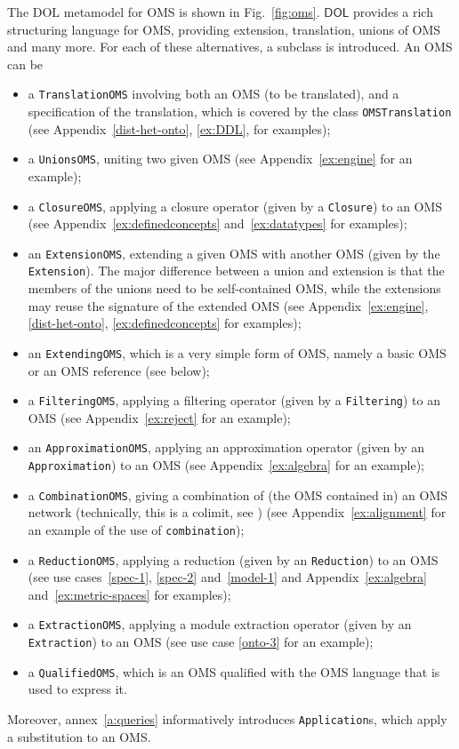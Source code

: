 \documentclass[10pt, a4paper]{isov2}
\newcommand*{\syntax}[1]{\texttt{#1}}
\newcommand*{\DOL}{\ensuremath{\mathsf{DOL}}\xspace}
\begin{document}
\label{c:OMS}



The DOL metamodel for OMS is shown in Fig.~\ref{fig:oms}.
\DOL provides a rich structuring language for OMS, providing
extension, translation, unions of OMS and many more.  For each of
these alternatives, a subclass is introduced. An OMS can be
 \begin{itemize} 
\item a \syntax{TranslationOMS} involving both
an OMS (to be translated), and a specification of the translation,
which is covered by the class \syntax{OMSTranslation}
(see Appendix~\ref{dist-het-onto}, \ref{ex:DDL}, for examples);
\item a \syntax{UnionsOMS}, uniting two given OMS 
(see Appendix~\ref{ex:engine} for an example);
\item a \syntax{ClosureOMS}, applying a closure operator
(given by a \syntax{Closure}) to an OMS (see Appendix~\ref{ex:definedconcepts} and~\ref{ex:datatypes} for examples); 
\item an \syntax{ExtensionOMS}, extending a given OMS with another OMS
  (given by the \syntax{Extension}). The major difference between a
  union and extension is that the members of the unions need to be
  self-contained OMS, while the extensions may reuse the signature of
  the extended OMS
  (see Appendix~\ref{ex:engine}, \ref{dist-het-onto}, \ref{ex:definedconcepts} for examples);
\item an \syntax{ExtendingOMS}, which is a very simple form of OMS,
namely a basic OMS or an OMS reference (see below);
\item a \syntax{FilteringOMS}, applying a filtering operator
(given by a \syntax{Filtering}) to an OMS
  (see Appendix~\ref{ex:reject} for an example);
\item an \syntax{ApproximationOMS}, applying an approximation operator
(given by an \syntax{Approximation}) to an OMS (see Appendix~\ref{ex:algebra} for an example);
\item a \syntax{CombinationOMS}, giving a combination of (the OMS
  contained in) an OMS network (technically, this is a colimit, see
  \cite{ZimmermanEtAl06}) 
  (see Appendix~\ref{ex:alignment} for an example of the use of \syntax{combination});
\item a \syntax{ReductionOMS}, applying a reduction
(given by an \syntax{Reduction}) to an OMS (see use cases~\ref{spec-1}, \ref{spec-2} and~\ref{model-1} and Appendix~\ref{ex:algebra} and~\ref{ex:metric-spaces} for examples);
\item a \syntax{ExtractionOMS}, applying a module extraction operator
(given by an \syntax{Extraction}) to an OMS
 (see use case \ref{onto-3} for an example);
\item a \syntax{QualifiedOMS}, which is an OMS qualified with the OMS
  language that is used to express it.
 \end{itemize} 
Moreover, annex~\ref{a:queries}
informatively introduces \syntax{Application}s, which apply a substitution
to an OMS.
\end{document}
